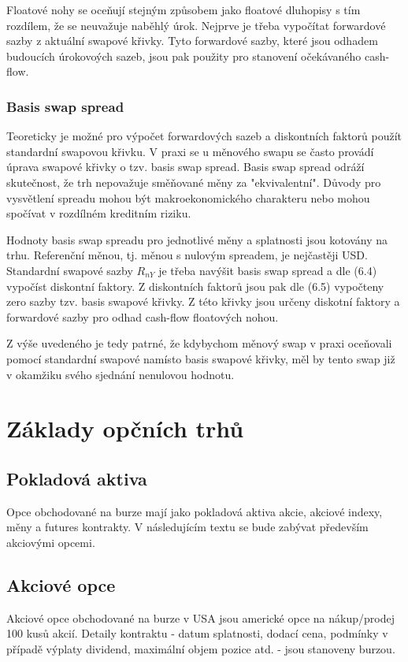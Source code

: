 \documentclass[a4paper]{book}
\begin{document}
Floatové nohy se oceňují stejným způsobem jako floatové dluhopisy s tím rozdílem, že se neuvažuje naběhlý úrok. Nejprve je třeba vypočítat forwardové sazby z aktuální swapové křivky. Tyto forwardové sazby, které jsou odhadem budoucích úrokovoých sazeb, jsou pak použity pro stanovení očekávaného cash-flow.

\subsection{Basis swap spread}

Teoreticky je možné pro výpočet forwardových sazeb a diskontních faktorů použít standardní swapovou křivku. V praxi se u měnového swapu se často provádí úprava swapové křivky o tzv. basis swap spread. Basis swap spread odráží skutečnost, že trh nepovažuje směňované měny za "ekvivalentní". Důvody pro vysvětlení spreadu mohou být makroekonomického charakteru nebo mohou spočívat v rozdílném kreditním riziku.

Hodnoty basis swap spreadu pro jednotlivé měny a splatnosti jsou kotovány na trhu. Referenční měnou, tj. měnou s nulovým spreadem, je nejčastěji USD. Standardní swapové sazby $R_{nY}$ je třeba navýšit basis swap spread a dle (6.4) vypočíst diskontní faktory. Z diskontních faktorů jsou pak dle (6.5) vypočteny zero sazby tzv. basis swapové křivky. Z této křivky jsou určeny diskotní faktory a forwardové sazby pro odhad cash-flow floatových nohou.

Z výše uvedeného je tedy patrné, že kdybychom měnový swap v praxi oceňovali pomocí standardní swapové namísto basis swapové křivky, měl by tento swap již v okamžiku svého sjednání nenulovou hodnotu.

\chapter{Základy opčních trhů}

\section{Pokladová aktiva}
Opce obchodované na burze mají jako pokladová aktiva akcie, akciové indexy, měny a futures kontrakty. V následujícím textu se bude zabývat především akciovými opcemi.

\section{Akciové opce}
Akciové opce obchodované na burze v USA jsou americké opce na nákup/prodej 100 kusů akcií. Detaily kontraktu - datum splatnosti, dodací cena, podmínky v případě výplaty dividend, maximální objem pozice atd. - jsou stanoveny burzou.\\
\end{document}
